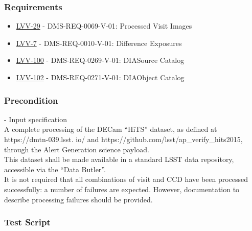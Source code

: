 \subsubsection{Requirements}\label{requirements-1}

\begin{itemize}
\tightlist
\item
  \href{https://jira.lsstcorp.org/browse/LVV-29}{LVV-29} -
  DMS-REQ-0069-V-01: Processed Visit Images
\item
  \href{https://jira.lsstcorp.org/browse/LVV-7}{LVV-7} -
  DMS-REQ-0010-V-01: Difference Exposures
\item
  \href{https://jira.lsstcorp.org/browse/LVV-100}{LVV-100} -
  DMS-REQ-0269-V-01: DIASource Catalog
\item
  \href{https://jira.lsstcorp.org/browse/LVV-102}{LVV-102} -
  DMS-REQ-0271-V-01: DIAObject Catalog
\end{itemize}

\subsubsection{Precondition}\label{precondition-1}

- Input specification\\[2\baselineskip]A complete processing of the
DECam ``HiTS'' dataset, as defined at https://dmtn-039.lsst. io/ and
https://github.com/lsst/ap\_verify\_hits2015, through the Alert
Generation science payload.\\
This dataset shall be made available in a standard LSST data repository,
accessible via the ``Data Butler''.\\
It is not required that all combinations of visit and CCD have been
processed successfully: a number of failures are expected. However,
documentation to describe processing failures should be provided.

\subsubsection{Test Script}\label{test-script-1}

